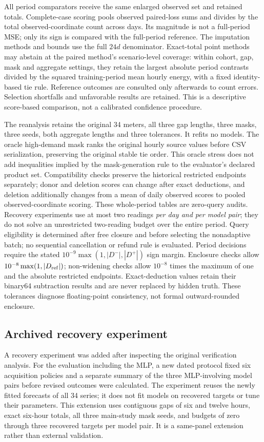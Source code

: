 All period comparators receive the same enlarged observed set and retained
totals. Complete-case scoring pools observed paired-loss sums and divides
by the total observed-coordinate count across days. Its magnitude is not
a full-period MSE; only its sign is compared with the full-period reference.
The imputation methods and bounds use the full $24d$ denominator. Exact-total
point methods may abstain at the paired method's scenario-level coverage:
within cohort, gap, mask and aggregate settings, they retain the largest
absolute period contrasts divided by the squared training-period mean
hourly energy, with a fixed identity-based tie rule.
Reference outcomes are consulted only afterwards to count errors. Selection
shortfalls and unfavorable results are retained. This is a descriptive
score-based comparison, not a calibrated confidence procedure.

The reanalysis retains the original 34 meters, all three gap lengths,
three masks, three seeds, both aggregate lengths and three tolerances.
It refits no models. The oracle high-demand mask ranks the original hourly
source values before CSV serialization, preserving the original stable
tie order. This oracle stress does not add inequalities implied by the
mask-generation rule to the evaluator's declared product set.
Compatibility checks preserve the historical
restricted endpoints separately; donor and deletion scores can change after
exact deductions, and deletion additionally changes from a mean of daily
observed scores to pooled observed-coordinate scoring.
These whole-period tables are zero-query audits. Recovery experiments use
at most two readings \emph{per day and per model pair}; they do not solve
an unrestricted two-reading budget over the entire period.
Query eligibility is determined after free closure and before selecting the
nonadaptive batch; no sequential cancellation or refund rule is evaluated.
Period decisions require the stated $10^{-9}\max(1,|D^-|,|D^+|)$
sign margin. Enclosure checks allow $10^{-8}\max(1,|D_{\rm ref}|)$;
non-widening checks allow $10^{-8}$ times the maximum of one and the
absolute restricted endpoints. Exact-deduction values retain their
binary64 subtraction results and are never replaced by hidden truth.
These tolerances diagnose floating-point consistency, not formal
outward-rounded enclosure.


\subsection{Archived recovery experiment}
A recovery experiment was added after inspecting the original verification
analysis. For the evaluation including the MLP, a new dated protocol fixed six
acquisition policies and a separate summary of the three MLP-involving
model pairs before revised outcomes were calculated. The experiment reuses
the newly fitted forecasts of all 34 series; it does not fit models on
recovered targets or tune their parameters.
This extension uses contiguous gaps of six and twelve hours, exact six-hour
totals, all three main-study mask seeds, and budgets of zero through three
recovered targets per model pair. It is a same-panel extension rather than
external validation.

